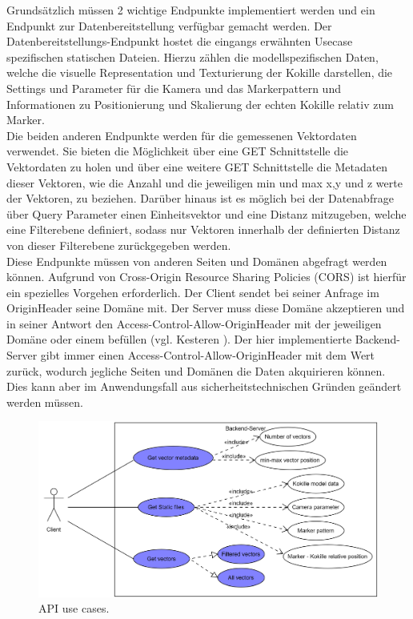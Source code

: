 Grundsätzlich müssen 2 wichtige Endpunkte implementiert werden und ein Endpunkt zur Datenbereitstellung verfügbar gemacht werden.
Der Datenbereitstellungs-Endpunkt hostet die eingangs erwähnten Usecase spezifischen statischen Dateien. Hierzu zählen die modellspezifischen Daten, welche die visuelle Representation und Texturierung der Kokille darstellen, die Settings und Parameter für die Kamera und das Markerpattern und Informationen zu Positionierung und Skalierung der echten Kokille relativ zum Marker.\\
Die beiden anderen Endpunkte werden für die gemessenen Vektordaten verwendet. Sie bieten die Möglichkeit über eine GET Schnittstelle die Vektordaten zu holen und über eine weitere GET Schnittstelle die Metadaten dieser Vektoren, wie die Anzahl und die jeweiligen min und max x,y und z werte der Vektoren, zu beziehen. Darüber hinaus ist es möglich bei der Datenabfrage über Query Parameter einen Einheitsvektor und eine Distanz mitzugeben, welche eine Filterebene definiert, sodass nur Vektoren innerhalb der definierten Distanz von dieser Filterebene zurückgegeben werden.\\
Diese Endpunkte müssen von anderen Seiten und Domänen abgefragt werden können. Aufgrund von Cross-Origin Resource Sharing Policies (CORS) ist hierfür ein spezielles Vorgehen erforderlich. Der Client sendet bei seiner Anfrage im \grqq Origin\grqq\space Header seine Domäne mit. Der Server muss diese Domäne akzeptieren und in seiner Antwort den \grqq Access-Control-Allow-Origin\grqq\space Header mit der jeweiligen Domäne oder einem \grqq *\grqq\space befüllen (vgl. Kesteren \cite{van2014cross}). Der hier implementierte Backend-Server gibt immer einen \grqq Access-Control-Allow-Origin\grqq\space Header mit dem Wert \grqq *\grqq\space zurück, wodurch jegliche Seiten und Domänen die Daten akquirieren können. Dies kann aber im Anwendungsfall aus sicherheitstechnischen Gründen geändert werden müssen.

\begin{figure}
	\centering
	\includegraphics[width=1\linewidth]{images/backend/APIUseCases}
	\caption{API use cases.}
	\label{fig:backendUseCase}
\end{figure}


